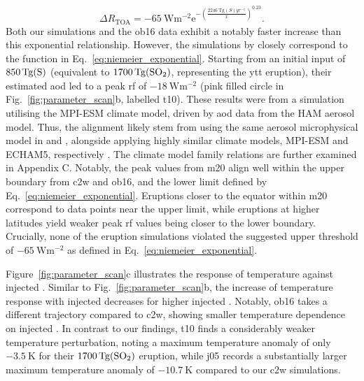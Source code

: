 \documentclass{ametsocV6.1}
\newcommand{\iso}[1][i]{{#1}njected \ce{SO2}}
\begin{document}
\begin{equation}
  \Delta
  R_{\mathrm{TOA}} =
  -\SI{65}{\watt\metre^{-2}}
  \mathrm{e}^{-{\left(\frac{\SI{2246}{\tera\gram(S)yr^{-1}}}{x}\right)}^{0.23}}.
  \label{eq:niemeier_exponential}
\end{equation}
%
Both our simulations and the \gls{ob16} data exhibit a notably faster increase than this
exponential relationship. However, the simulations by \citet{timmreck2010} closely
correspond to the function in Eq.~\ref{eq:niemeier_exponential}. Starting from an
initial input of \(\SI{850}{\tera\gram(\ce{S})}\) (equivalent to
\(\SI{1700}{\tera\gram(\ce{SO2})}\), representing the \gls{ytt} eruption), their
estimated \gls{aod} led to a peak \gls{rf} of \(\SI{-18}{\watt\metre^{-2}}\) (pink
filled circle in Fig.~\ref{fig:parameter_scan}b, labelled \gls{t10}). These results were
from a simulation utilising the MPI-ESM climate model, driven by \gls{aod} data from the
HAM aerosol model. Thus, the alignment likely stem from using the same aerosol
microphysical model in \citet{timmreck2010} and \citet{niemeier2015}, alongside applying
highly similar climate models, MPI-ESM and ECHAM5, respectively \citep{kuma2023}. The
climate model family relations are further examined in Appendix C. Notably, the peak
values from \gls{m20} align well within the upper boundary from \gls{c2w} and
\gls{ob16}, and the lower limit defined by Eq.~\ref{eq:niemeier_exponential}. Eruptions
closer to the equator within \gls{m20} correspond to data points near the upper limit,
while eruptions at higher latitudes yield weaker peak \gls{rf} values being closer to
the lower boundary. Crucially, none of the eruption simulations violated the suggested
upper threshold of \(\SI{-65}{\watt\metre^{-2}}\) as defined in
Eq.~\ref{eq:niemeier_exponential}.

Figure~\ref{fig:parameter_scan}c illustrates the response of temperature against \iso{}.
Similar to Fig.~\ref{fig:parameter_scan}b, the increase of temperature response with
\iso{} decreases for higher \iso{}. Notably, \gls{ob16} takes a different trajectory
compared to \gls{c2w}, showing smaller temperature dependence on \iso{}. In contrast to
our findings, \gls{t10} finds a considerably weaker temperature perturbation, noting a
maximum temperature anomaly of only \(\SI{-3.5}{\kelvin}\) for their
\(\SI{1700}{\tera\gram(\ce{SO2})}\) eruption, while \gls{j05} records a substantially
larger maximum temperature anomaly of \(\SI{-10.7}{\kelvin}\) compared to our \gls{c2w}
simulations.
\end{document}
